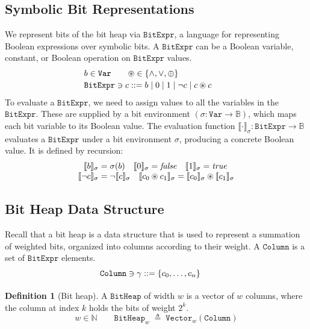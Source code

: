 \documentclass[conference]{IEEEtran}
\newcommand{\sem}[1]{\llbracket #1 \rrbracket}
\newcommand{\csem}[1]{\sem{#1}_{\sigma}}
\newcommand{\BitExpr}{\ensuremath{\texttt{BitExpr}}\xspace}
\newcommand{\Col}{\ensuremath{\texttt{Column}}\xspace}
\newcommand{\Heap}{\ensuremath{\texttt{BitHeap}}\xspace}
\newcommand{\Vect}{\ensuremath{\texttt{Vector}}\xspace}
\theoremstyle{plain}
\theoremstyle{definition}
\newtheorem{definition}[theorem]{Definition}
\begin{document}
\subsection{Symbolic Bit Representations}\label{subsec:bitexpr}
We represent bits of the bit heap via \BitExpr, a language for representing Boolean expressions over symbolic bits.
A \BitExpr can be a Boolean variable, constant, or Boolean operation on \BitExpr values.
\[
\begin{array}{r@{\;}c@{\;}l@{\qquad}l}
\multicolumn{4}{l}{%
  b \in \texttt{Var}  \qquad
  \circledast \in \{\wedge,\vee,\oplus\}}\\[2pt]
\BitExpr \ni c &::=& b \mid 0 \mid 1 \mid \neg c \mid c \circledast c &
\end{array}
\]
To evaluate a \BitExpr, we need to assign values to all the variables in the \BitExpr.
These are supplied by a bit environment $(\sigma : \texttt{Var} \to \mathbb B)$,
which maps each bit variable to its Boolean value. 
The evaluation function $\csem{\cdot} : \BitExpr \to \mathbb B$ evaluates a \BitExpr under a bit environment $\sigma$,
producing a concrete Boolean value. It is defined by recursion:
\[
\begin{array}{r@{\;}c@{\;}l}
\csem{b} &=& \sigma(b) \quad \csem{0} = \mathit{false} \quad \csem{1} = \mathit{true}\\
\csem{\neg c} &=& \neg \csem{c} \quad \csem{c_0 \circledast c_1} = \csem{c_0} \circledast \csem{c_1}
\end{array}
\]

\subsection{Bit Heap Data Structure}\label{subsec:bitheap}
Recall that a bit heap is a data structure that is used to represent a summation of weighted bits,
organized into columns according to their weight.
A \Col is a set of \BitExpr elements.
\[
\begin{array}{r@{\;}c@{\;}l@{\qquad}l}
\Col \ni \gamma &::=& \{c_0,\dots,c_n\} \\[2pt]
\end{array}
\]

\begin{definition}[Bit heap]
\label{def:bitheap}
A \Heap of width $w$ is a vector of $w$ columns,
where the column at index $k$ holds the bits of weight $2^k$.
\[
  w \in \mathbb{N} \qquad \Heap_w \;\triangleq\; \Vect_w(\Col)
\]
\end{definition}
\end{document}
